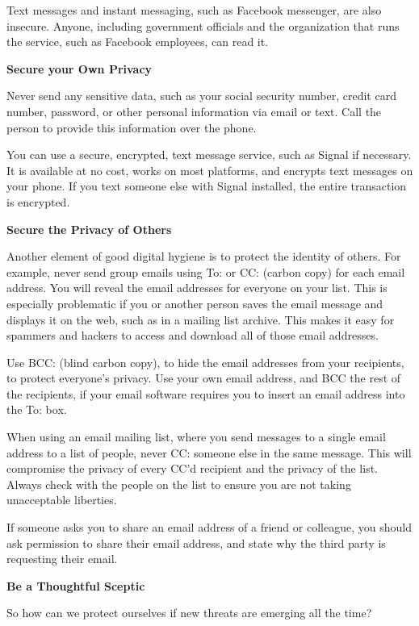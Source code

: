 \documentclass[
]{book}
\theoremstyle{definition}
\theoremstyle{definition}
\theoremstyle{definition}
\theoremstyle{definition}
\theoremstyle{remark}
\begin{document}
Text messages and instant messaging, such as Facebook messenger, are also insecure. Anyone, including government officials and the organization that runs the service, such as Facebook employees, can read it.

\textbf{Secure your Own Privacy}

Never send any sensitive data, such as your social security number, credit card number, password, or other personal information via email or text. Call the person to provide this information over the phone.

You can use a secure, encrypted, text message service, such as Signal if necessary. It is available at no cost, works on most platforms, and encrypts text messages on your phone. If you text someone else with Signal installed, the entire transaction is encrypted.

\textbf{Secure the Privacy of Others}

Another element of good digital hygiene is to protect the identity of others. For example, never send group emails using To: or CC: (carbon copy) for each email address. You will reveal the email addresses for everyone on your list. This is especially problematic if you or another person saves the email message and displays it on the web, such as in a mailing list archive. This makes it easy for spammers and hackers to access and download all of those email addresses.

Use BCC: (blind carbon copy), to hide the email addresses from your recipients, to protect everyone's privacy. Use your own email address, and BCC the rest of the recipients, if your email software requires you to insert an email address into the To: box.

When using an email mailing list, where you send messages to a single email address to a list of people, never CC: someone else in the same message. This will compromise the privacy of every CC'd recipient and the privacy of the list. Always check with the people on the list to ensure you are not taking unacceptable liberties.

If someone asks you to share an email address of a friend or colleague, you should ask permission to share their email address, and state why the third party is requesting their email.

\textbf{Be a Thoughtful Sceptic}

So how can we protect ourselves if new threats are emerging all the time?
\end{document}
